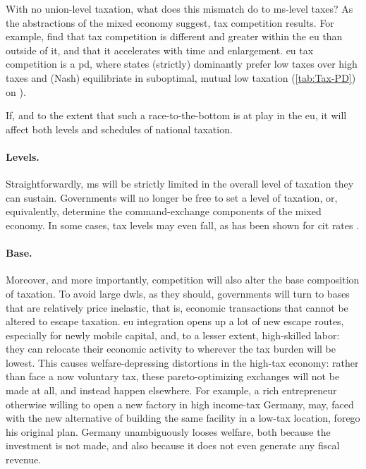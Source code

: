 With no union-level taxation, what does this mismatch do to
\gls{ms}-level taxes?
As the abstractions of the mixed economy suggest, tax competition results.
For example, \cite{Genschel2009} find that tax competition is different and greater within the \gls{eu} than outside of it, and that it accelerates with time and enlargement.
\gls{eu} tax competition is a \gls{pd}, where states (strictly) dominantly prefer low taxes over high taxes and (Nash) equilibriate in suboptimal, mutual low taxation (\autoref{tab:Tax-PD}) on ).



If, and to the extent that such a race-to-the-bottom is at play in the \gls{eu}, it will affect both levels and schedules of national taxation.

\paragraph{Levels.}
Straightforwardly, \gls{ms} will be strictly limited in the overall level of taxation they can sustain.
Governments will no longer be free to set a level of taxation, or, equivalently, determine the command-exchange components of the mixed economy.
In some cases, tax levels may even fall, as has been shown for \gls{cit} rates \citep{Piatkowski2008}.


\paragraph{Base.}
Moreover, and more importantly, competition will also alter the base composition of taxation.
To avoid large \glspl{dwl}, as they should, governments will turn to bases that are relatively price inelastic, that is, economic transactions that cannot be altered to escape taxation.
\gls{eu} integration opens up a lot of new escape routes, especially for newly mobile capital, and, to a lesser extent, high-skilled labor:
they can relocate their economic activity to wherever the tax burden will be lowest.
This causes welfare-depressing distortions in the high-tax economy:
rather than face a now voluntary tax, these pareto-optimizing exchanges will not be made at all, and instead happen elsewhere.
For example, a rich entrepreneur otherwise willing to open a new factory in high income-tax Germany, may, faced with the new alternative of building the same facility in a low-tax location, forego his original plan.
Germany unambiguously looses welfare, both because the investment is not made, and also because it does not even generate any fiscal revenue.

